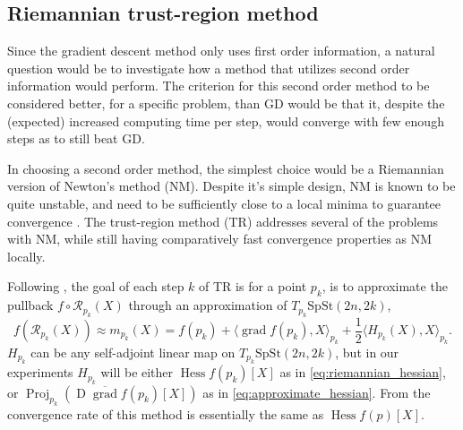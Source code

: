 \subsection{Riemannian trust-region method}
Since the gradient descent method only uses first order information, a natural question would be to investigate how a method that utilizes second order information would perform. The criterion for this second order method to be considered better, for a specific problem, than GD would be that it, despite the (expected) increased computing time per step, would converge with few enough steps as to still beat GD. 

In choosing a second order method, the simplest choice would be a Riemannian version of Newton's method (NM). Despite it's simple design, NM is known to be quite unstable, and need to be sufficiently close to a local minima to guarantee convergence \cite[p.~122]{Boumal2023}. The trust-region method (TR) addresses several of the problems with NM, while still having comparatively fast convergence properties as NM locally. 

Following \cite[p.~131]{Boumal2023}, the goal of each step $k$ of TR is for a point $p_{k}$, is to approximate the pullback $f\circ \mathcal{R}_{p_{k}}(X)$ through an approximation of $T_{p_{k}}\mathrm{SpSt}(2n, 2k)$,
%
\begin{equation*}
f(\mathcal{R}_{p_{k}}(X))\approx m_{p_{k}}(X)=f(p_{k})+\langle \operatorname{grad}f(p_{k}),X \rangle _{p_{k}}+ \frac{1}{2}\langle H_{p_{k}}(X),X \rangle _{p_{k}}.
\end{equation*}
%
$H_{p_{k}}$ can be any self-adjoint linear map on $T_{p_{k}}\mathrm{SpSt}(2n, 2k)$, but in our experiments $H_{p_{k}}$ will be either $\operatorname{Hess}f(p_{k})[X]$ as in \eqref{eq:riemannian_hessian}, or $\operatorname{Proj}_{p_{k}}(\operatorname{D}\overline{\operatorname{grad}}f(p_{k})[X])$ as in \eqref{eq:approximate_hessian}. From \cite[Prop.~5.44]{Boumal2023} the convergence rate of this method is essentially the same as $\operatorname{Hess}f(p)[X]$. 

